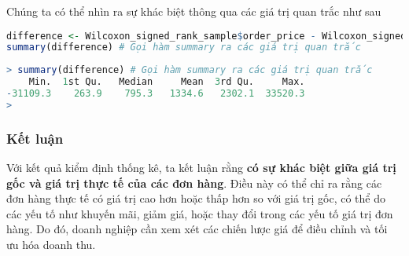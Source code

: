 Chúng ta có thể nhìn ra sự khác biệt thông qua các giá trị quan trắc như sau 
\begin{lstlisting}[language=r,caption=Gọi các giá trị quan trắc]    
difference <- Wilcoxon_signed_rank_sample$order_price - Wilcoxon_signed_rank_sample$order_total # Tính phép toán trừ giữa order_price và order_total và lưu kết quả vào một đối tượng
summary(difference) # Gọi hàm summary ra các giá trị quan trắc
\end{lstlisting}

\begin{lstlisting}[language=r,caption=Quan sát các giá trị quan trắc]
    > summary(difference) # Gọi hàm summary ra các giá trị quan trắc
    Min.  1st Qu.   Median     Mean  3rd Qu.     Max. 
-31109.3    263.9    795.3   1334.6   2302.1  33520.3 
> 
\end{lstlisting}

\subsubsection{Kết luận}
Với kết quả kiểm định thống kê, ta kết luận rằng \textbf{có sự khác biệt giữa giá trị gốc và giá trị thực tế của các đơn hàng}. Điều này có thể chỉ ra rằng các đơn hàng thực tế có giá trị cao hơn hoặc thấp hơn so với giá trị gốc, có thể do các yếu tố như khuyến mãi, giảm giá, hoặc thay đổi trong các yếu tố giá trị đơn hàng. Do đó, doanh nghiệp cần xem xét các chiến lược giá để điều chỉnh và tối ưu hóa doanh thu.
\filbreak
